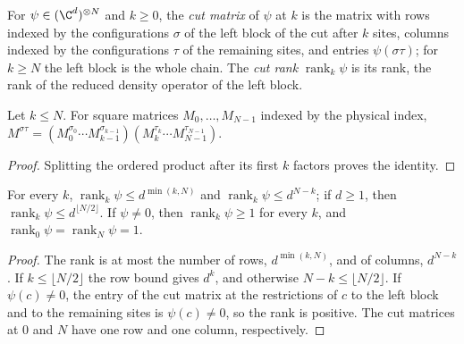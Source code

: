 \begin{definition}
    \label{def:seqanc_cut_matrix}
    \leanok
    For $\psi\in(\C^d)^{\otimes N}$ and $k\ge 0$, the \emph{cut matrix} of
    $\psi$ at $k$ is the matrix with rows indexed by the configurations
    $\sigma$ of the left block of the cut after $k$ sites, columns indexed by
    the configurations $\tau$ of the remaining sites, and entries
    $\psi(\sigma\tau)$; for $k\ge N$ the left block is the whole chain. The
    \emph{cut rank} $\operatorname{rank}_k\psi$ is its rank, the rank of the
    reduced density operator of the left block.
\end{definition}

\begin{lemma}
    \label{thm:seqanc_cut_split}
    \leanok
    Let $k\le N$. For square matrices $M_0,\dots,M_{N-1}$ indexed by the
    physical index, $M^{\sigma\tau}=(M_0^{\sigma_0}\cdots
        M_{k-1}^{\sigma_{k-1}})(M_k^{\tau_k}\cdots M_{N-1}^{\tau_{N-1}})$.
\end{lemma}
\begin{proof}
    \leanok
    Splitting the ordered product after its first $k$ factors proves the identity.
\end{proof}

\begin{lemma}
    \label{thm:seqanc_cut_rank_bounds}
    \leanok
    For every $k$, $\operatorname{rank}_k\psi\le d^{\min(k,N)}$ and
    $\operatorname{rank}_k\psi\le d^{N-k}$; if $d\ge 1$, then
    $\operatorname{rank}_k\psi\le d^{\lfloor N/2\rfloor}$. If $\psi\ne 0$, then
    $\operatorname{rank}_k\psi\ge 1$ for every $k$, and
    $\operatorname{rank}_0\psi=\operatorname{rank}_N\psi=1$.
\end{lemma}
\begin{proof}
    \leanok
    The rank is at most the number of rows, $d^{\min(k,N)}$, and of columns,
    $d^{N-k}$. If $k\le\lfloor N/2\rfloor$ the row bound gives $d^k$, and
    otherwise $N-k\le\lfloor N/2\rfloor$. If $\psi(c)\ne 0$, the entry of the
    cut matrix at the restrictions of $c$ to the left block and to the
    remaining sites is $\psi(c)\ne 0$, so the rank is positive. The cut
    matrices at $0$ and $N$ have one row and one column, respectively.
\end{proof}

